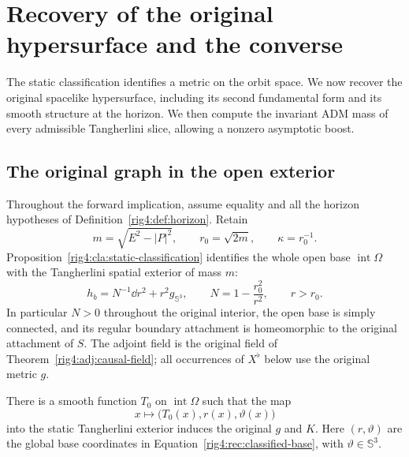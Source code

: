 \section{Recovery of the original hypersurface and the converse}
\label{rig4:rec:section}

The static classification identifies a metric on the orbit space.  We now
recover the original spacelike hypersurface, including its second fundamental
form and its smooth structure at the horizon.  We then compute the invariant
ADM mass of every admissible Tangherlini slice, allowing a nonzero asymptotic
boost.

\subsection{The original graph in the open exterior}

Throughout the forward implication, assume equality and all the horizon
hypotheses of Definition~\ref{rig4:def:horizon}.  Retain
\[
 m=\sqrt{E^2-|P|^2},\qquad r_0=\sqrt{2m},\qquad
 \kappa=r_0^{-1}.
\]
Proposition~\ref{rig4:cla:static-classification} identifies the whole open base
$\operatorname{int}\Omega$ with the Tangherlini spatial exterior of mass $m$:
\begin{equation}
 h_b=N^{-1}\dd r^2+r^2g_{\mathbb S^3},\qquad
 N=1-\frac{r_0^2}{r^2},\qquad r>r_0.
 \label{rig4:rec:classified-base}
\end{equation}
In particular $N>0$ throughout the original interior, the open base is simply
connected, and its regular boundary attachment is homeomorphic to the original
attachment of $S$.  The adjoint field is the original field of
Theorem~\ref{rig4:adj:causal-field}; all occurrences of $X^\flat$ below use the
original metric $g$.

\begin{lemma}
\label{rig4:rec:interior-graph}
There is a smooth function $T_0$ on $\operatorname{int}\Omega$ such that the
map
\[
 x\longmapsto\bigl(T_0(x),r(x),\vartheta(x)\bigr)
\]
into the static Tangherlini exterior induces the original $g$ and $K$.
Here $(r,\vartheta)$ are the global base coordinates in
Equation~\eqref{rig4:rec:classified-base}, with $\vartheta\in\mathbb S^3$.
\end{lemma}


